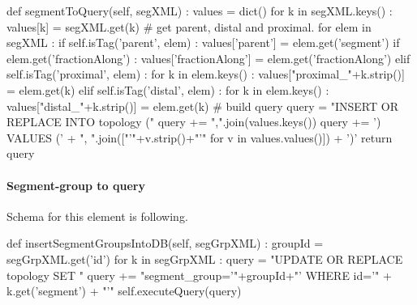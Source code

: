 \documentclass[]{article}%
\begin{document}
\nwenddocs{}\endmoddef\nwstartdeflinemarkup{}\nwenddeflinemarkup
def segmentToQuery(self, segXML) :
    values = dict()
    for k in segXML.keys() :
      values[k] = segXML.get(k)
    # get parent, distal and proximal.
    for elem in segXML :
      if self.isTag('parent', elem) :
        values['parent'] = elem.get('segment')
        if elem.get('fractionAlong') :
          values['fractionAlong'] =  elem.get('fractionAlong')
      elif self.isTag('proximal', elem) :
        for k in elem.keys() :
          values["proximal_"+k.strip()] = elem.get(k)
      elif self.isTag('distal', elem) :
        for k in elem.keys() :
          values["distal_"+k.strip()] = elem.get(k)
    # build query
    query = "INSERT OR REPLACE INTO topology ("
    query += ",".join(values.keys())
    query += ') VALUES (' + ", ".join(["'"+v.strip()+"'" for v in values.values()]) + ')'
    return query
\eatline
{}\nwendcode{}\nwdocspar
\paragraph{Segment-group to query}
  
  Schema for this element is following.



\nwenddocs{}\endmoddef\nwstartdeflinemarkup{}\nwenddeflinemarkup
def insertSegmentGroupsIntoDB(self, segGrpXML) :
    groupId = segGrpXML.get('id')
    for k in segGrpXML :
      query = "UPDATE OR REPLACE topology SET "
      query += "segment_group='"+groupId+"' WHERE id='" + k.get('segment') + "'"
      self.executeQuery(query)
\end{document}
